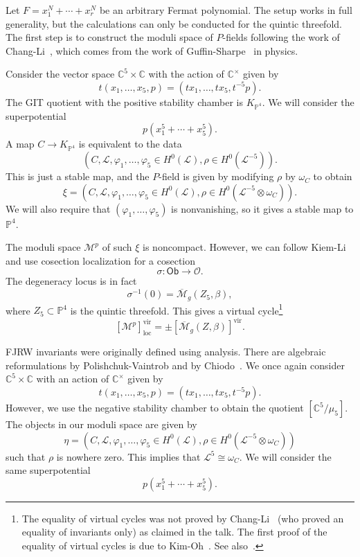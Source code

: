\documentclass[10pt]{amsart}
\theoremstyle{definition}
\theoremstyle{remark}
\theoremstyle{plain}
\theoremstyle{definition}
\theoremstyle{remark}
\newcommand{\C}{\mathbb{C}}
\renewcommand{\P}{\mathbb{P}}
\newcommand{\M}{\mathcal{M}}
\newcommand{\Mbar}{\overline{\mathcal{M}}}
\newcommand{\mc}[1]{\mathcal{#1}}
\newcommand{\mr}[1]{\mathrm{#1}}
\newcommand{\ms}[1]{\mathsf{#1}}
\newcommand{\1}{\mathbf{1}}
\newcommand{\2}{\mathbf{2}}
\newcommand{\3}{\mathbf{3}}
\newcommand{\vir}{\mr{vir}}
\begin{document}
Let $F = x_1^N + \cdots + x_r^N$ be an arbitrary Fermat polynomial. The setup works in full generality, but the calculations can only be conducted for the quintic threefold. The first step is to construct the moduli space of $P$-fields following the work of Chang-Li~\cite{pfieldschangli}, which comes from the work of Guffin-Sharpe~\cite{guffin} in physics.

Consider the vector space $\C^5 \times \C$ with the action of $\C^{\times}$ given by
\[ t(x_1, \ldots, x_5, p) = (t x_1, \ldots, t x_5, t^{-5}p). \]
The GIT quotient with the positive stability chamber is $K_{\P^4}$. We will consider the superpotential
\[ p (x_1^5 + \cdots + x_5^5). \]
A map $C \to K_{\P^4}$ is equivalent to the data
\[ (C, \mc{L}, \varphi_1, \ldots, \varphi_5 \in H^0(\mc{L}), \rho \in H^0( \mc{L}^{-5} )). \]
This is just a stable map, and the $P$-field is given by modifying $\rho$ by $\omega_C$ to obtain
\[ \xi = (C, \mc{L}, \varphi_1, \ldots, \varphi_5 \in H^0(\mc{L}), \rho \in H^0( \mc{L}^{-5}\otimes \omega_C )). \]
We will also require that $(\varphi_1, \ldots, \varphi_5)$ is nonvanishing, so it gives a stable map to $\P^4$.

The moduli space $\M^p$ of such $\xi$ is noncompact. However, we can follow Kiem-Li~\cite{cosection} and use cosection localization for a cosection
\[ \sigma \colon \ms{Ob} \to \mc{O}. \]
The degeneracy locus is in fact
\[ \sigma^{-1}(0) = \Mbar_g(Z_5,\beta), \]
where $Z_5 \subset \P^4$ is the quintic threefold.
This gives a virtual cycle\footnote{The equality of virtual cycles was not proved by Chang-Li~\cite{pfieldschangli} (who proved an equality of invariants only) as claimed in the talk. The first proof of the equality of virtual cycles is due to Kim-Oh~\cite{localizedchern}. See also~\cite{clqmap}.}
\[ [\M^p]^{\vir}_{\mr{loc}} = \pm [\Mbar_g(Z,\beta)]^{\vir}. \]


FJRW invariants were originally defined using analysis. There are algebraic reformulations by Polishchuk-Vaintrob and by Chiodo~\cite{mfcohftFJRW,wittenkthy}. We once again consider $\C^5 \times \C$ with an action of $\C^{\times}$ given by
\[ t(x_1, \ldots, x_5, p) = (t x_1, \ldots, t x_5, t^{-5}p). \]
However, we use the negative stability chamber to obtain the quotient $[\C^5/\mu_5]$. The objects in our moduli space are given by
\[ \eta = (C, \mc{L}, \varphi_1, \ldots, \varphi_5 \in H^0(\mc{L}), \rho \in H^0( \mc{L}^{-5}\otimes \omega_C )) \]
such that $\rho$ is nowhere zero. This implies that $\mc{L}^5 \cong \omega_C$. We will consider the same superpotential
\[ p(x_1^5 + \cdots + x_5^5). \]
\end{document}
